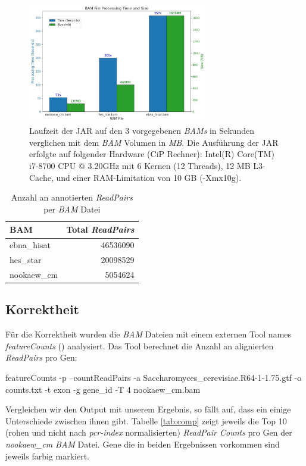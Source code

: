 \documentclass[12pt]{article}
\begin{document}
\begin{figure}[tpb]
    \centering
    \includegraphics[width=0.7\textwidth]{./plots/times_bam.jpg}
    \caption{Laufzeit der JAR auf den 3 vorgegebenen \textit{BAMs} in Sekunden verglichen mit dem \textit{BAM} Volumen in \textit{MB}. 
    Die Ausführung der JAR erfolgte auf folgender Hardware (CiP Rechner): Intel(R) Core(TM) i7-8700 CPU @ 3.20GHz mit 6 Kernen (12 Threads), 12 MB L3-Cache, und einer RAM-Limitation von 10 GB (-Xmx10g). }
    \label{fig:-plots-times_bam-jpg}
\end{figure}

\begin{table}[tpb]
    \centering
    \caption{Anzahl an annotierten \textit{ReadPairs} per \textit{BAM} Datei}
    \label{tab:amount}

    \begin{tabular}{l|r}
        \textbf{BAM} & \textbf{Total \textit{ReadPairs}} \\ \hline
          ebna\_hisat   & 46536090 \\
          hes\_star    & 20098529 \\
          nookaew\_cm    &  5054624 \\
    \end{tabular}
\end{table}

\subsection{Korrektheit}
Für die Korrektheit wurden die \textit{BAM} Dateien mit einem externen Tool names \textit{featureCounts} (\cite{liao2014featurecounts}) analysiert.
Das Tool berechnet die Anzahl an alignierten \textit{ReadPairs} pro Gen:
\begin{verbatim*}
featureCounts -p --countReadPairs -a Saccharomyces_cerevisiae.R64-1-1.75.gtf 
-o counts.txt -t exon -g gene_id -T 4 nookaew_cm.bam                                                                                                 
\end{verbatim*}
Vergleichen wir den Output  mit unserem Ergebnis, so fällt auf, dass ein einige Unterschiede zwischen ihnen gibt.
Tabelle \ref{tab:comp} zeigt jeweils die Top 10 (rohen und nicht nach \textit{pcr-index} normalisierten) \textit{ReadPair Counts} pro Gen der \textit{nookaew\_cm BAM} Datei. Gene die in beiden 
Ergebnissen vorkommen sind jeweils farbig markiert. 
\end{document}
